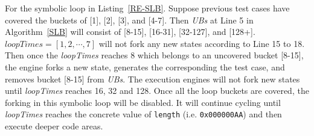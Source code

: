 For the symbolic loop in Listing~\ref{RE-SLB}. Suppose previous test cases have covered the buckets of [1], [2], [3], and [4-7]. Then \textit{UBs} at Line 5 in Algorithm~\ref{SLB} will consist of [8-15], [16-31], [32-127], and [128+]. $\textit{loopTimes}=[1, 2, \cdots, 7]$ will not fork any new states according to Line 15 to 18. Then once the \textit{loopTimes} reaches 8 which belongs to an uncovered bucket [8-15], the engine forks a new state,  generates the corresponding the test case, and removes bucket [8-15] from \textit{UBs}. The execution engines will not fork new states until \textit{loopTimes} reaches 16, 32 and 128. Once all the loop buckets are covered, the forking in this symbolic loop will be disabled. It will continue cycling until \textit{loopTimes} reaches the concrete value of \texttt{length} (i.e. \texttt{0x000000AA}) and then execute deeper code areas.

